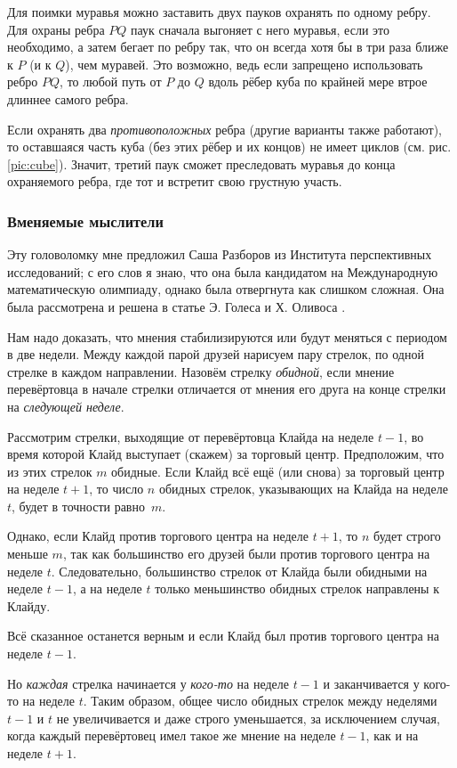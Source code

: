 Для поимки муравья можно заставить двух пауков охранять по одному ребру.
Для охраны ребра $PQ$ паук сначала выгоняет с него муравья, если это необходимо, а затем бегает по ребру так, что он всегда хотя бы в три раза ближе к $P$ (и к $Q$), чем муравей.
Это возможно, ведь если запрещено использовать ребро $PQ$, то любой путь от $P$ до $Q$ вдоль рёбер куба по крайней мере втрое длиннее самого ребра.

Если охранять два \emph{противоположных} ребра (другие варианты также работают), то оставшаяся часть куба (без этих рёбер и их концов) не имеет циклов (см. рис. \ref{pic:cube}).
Значит, третий паук сможет преследовать муравья до конца охраняемого ребра, где тот и встретит свою грустную участь.

\subsubsection*{Вменяемые мыслители}

Эту головоломку мне предложил Саша Разборов из Института перспективных исследований;
с его слов я знаю, что она была кандидатом на Международную математическую олимпиаду, однако была отвергнута как слишком сложная.
Она была рассмотрена и решена в статье Э. Голеса и Х. Оливоса \cite{31}.

Нам надо доказать, что мнения стабилизируются или будут меняться с периодом в две недели.
Между каждой парой друзей нарисуем пару стрелок, по одной стрелке в каждом направлении.
Назовём стрелку \emph{обидной}, если мнение перевёртовца в начале стрелки отличается от мнения его друга на конце стрелки на \emph{следующей неделе}.

Рассмотрим стрелки, выходящие от перевёртовца Клайда на неделе $t - 1$, во время которой Клайд выступает (скажем) за торговый центр.
Предположим, что из этих стрелок $m$ обидные.
Если Клайд всё ещё (или снова) за торговый центр на неделе $t + 1$, то число  $n$ обидных стрелок, указывающих на Клайда на неделе $t$, будет в точности равно~$m$.

Однако, если Клайд против торгового центра на неделе $t + 1$, то $n$ будет строго меньше $m$, так как большинство его друзей были против торгового центра на неделе $t$.
Следовательно, большинство стрелок от Клайда были обидными на неделе $t - 1$, а на неделе $t$ только меньшинство обидных стрелок направлены к Клайду.

Всё сказанное останется верным и если Клайд был против торгового центра на неделе $t - 1$.

Но \emph{каждая} стрелка начинается у \emph{кого-то} на неделе $t - 1$ и заканчивается у кого-то на неделе $t$.
Таким образом, общее число обидных стрелок между неделями $t - 1$ и $t$ не увеличивается и даже строго уменьшается, за исключением случая, когда каждый перевёртовец имел такое же мнение на неделе $t - 1$, как и на неделе $t + 1$.

